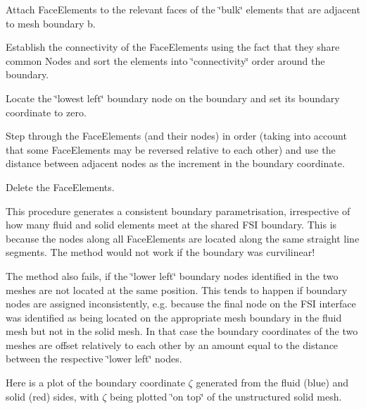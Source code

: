 \begin{DoxyEnumerate}
\item Attach {\ttfamily Face\+Elements} to the relevant faces of the \char`\"{}bulk\char`\"{} elements that are adjacent to mesh boundary {\ttfamily b}.
\item Establish the connectivity of the {\ttfamily Face\+Elements} using the fact that they share common {\ttfamily Nodes} and sort the elements into \char`\"{}connectivity\char`\"{} order around the boundary.
\item Locate the \char`\"{}lowest left\char`\"{} boundary node on the boundary and set its boundary coordinate to zero.
\item Step through the {\ttfamily Face\+Elements} (and their nodes) in order (taking into account that some {\ttfamily Face\+Elements} may be reversed relative to each other) and use the distance between adjacent nodes as the increment in the boundary coordinate.
\item Delete the {\ttfamily Face\+Elements}.
\end{DoxyEnumerate}This procedure generates a consistent boundary parametrisation, irrespective of how many fluid and solid elements meet at the shared F\+SI boundary. This is because the nodes along all {\ttfamily Face\+Elements} are located along the same straight line segments. The method would not work if the boundary was curvilinear!

The method also fails, if the \char`\"{}lower left\char`\"{} boundary nodes identified in the two meshes are not located at the same position. This tends to happen if boundary nodes are assigned inconsistently, e.\+g. because the final node on the F\+SI interface was identified as being located on the appropriate mesh boundary in the fluid mesh but not in the solid mesh. In that case the boundary coordinates of the two meshes are offset relatively to each other by an amount equal to the distance between the respective \char`\"{}lower left\char`\"{} nodes.

Here is a plot of the boundary coordinate $ \zeta $ generated from the fluid (blue) and solid (red) sides, with $ \zeta $ being plotted \char`\"{}on top\char`\"{} of the unstructured solid mesh.

